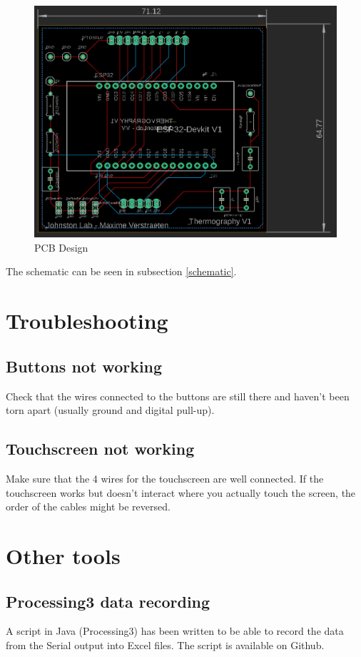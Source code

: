 \documentclass[a4paper]{article}
\begin{document}
\begin{figure}
    \centering
    \includegraphics[width = 12cm]{images/BoardView.PNG}
    \caption{PCB Design}
    \label{fig:BoardView}
\end{figure}


The schematic can be seen in subsection \ref{schematic}.

\section{Troubleshooting}
\subsection{Buttons not working}
Check that the wires connected to the buttons are still there and haven't been torn apart (usually ground and digital pull-up).
\subsection{Touchscreen not working}
Make sure that the 4 wires for the touchscreen are well connected. If the touchscreen works but doesn't interact where you actually touch the screen, the order of the cables might be reversed.
\subsection{}

\section{Other tools}
\subsection{Processing3 data recording}
A script in Java (Processing3) has been written to be able to record the data from the Serial output into Excel files.
The script is available on Github.
\end{document}

